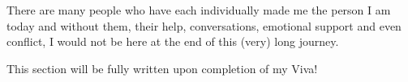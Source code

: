 There are many people who have each individually made me the person I am today and without them, their help, conversations, emotional support and even conflict, I would not be here at the end of this (very) long journey.

This section will be fully written upon completion of my Viva!


